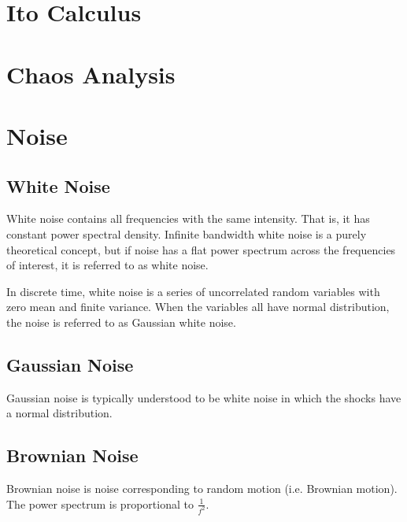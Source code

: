 \section{Ito Calculus}

\section{Chaos Analysis}

\section{Noise}

\subsection{White Noise}
White noise contains all frequencies with the same intensity. That is, it has constant power spectral density. Infinite bandwidth white noise is a purely theoretical concept, but if noise has a flat power spectrum across the frequencies of interest, it is referred to as white noise. 

In discrete time, white noise is a series of uncorrelated random variables with zero mean and finite variance. When the variables all have normal distribution, the noise is referred to as Gaussian white noise. 

\subsection{Gaussian Noise}
Gaussian noise is typically understood to be white noise in which the shocks have a normal distribution.

\subsection{Brownian Noise}
Brownian noise is noise corresponding to random motion (i.e. Brownian motion). The power spectrum is proportional to $\frac{1}{f^2}$.